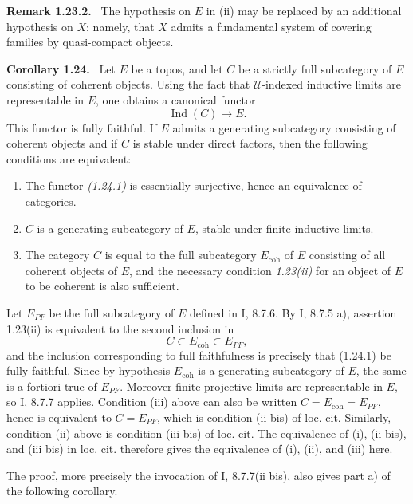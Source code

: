 \documentclass[11pt]{article}
\newcommand{\U}{\mathcal{U}}
\newcommand{\Ind}{\operatorname{Ind}}
\newcommand{\coh}{\mathrm{coh}}
\newenvironment{statement}[1]{\par\medskip\noindent\textbf{#1.}\ }{\par\medskip}
\newenvironment{remarktext}[1]{\par\medskip\noindent\textbf{#1.}\ }{\par\medskip}
\begin{document}
\begin{remarktext}{Remark 1.23.2}
The hypothesis on \(E\) in (ii) may be replaced by an additional hypothesis on \(X\): namely, that \(X\) admits a fundamental system of covering families by quasi-compact objects.
\end{remarktext}

\begin{statement}{Corollary 1.24}
Let \(E\) be a topos, and let \(C\) be a strictly full subcategory of \(E\) consisting of coherent objects. Using the fact that \(\U\)-indexed inductive limits are representable in \(E\), one obtains a canonical functor
\[
\Ind(C)\longrightarrow E.
\tag{1.24.1}
\]
This functor is fully faithful. If \(E\) admits a generating subcategory consisting of coherent objects and if \(C\) is stable under direct factors, then the following conditions are equivalent:
\begin{enumerate}[label=(\roman*)]
\item The functor \emph{(1.24.1)} is essentially surjective, hence an equivalence of categories.
\item \(C\) is a generating subcategory of \(E\), stable under finite inductive limits.
\item The category \(C\) is equal to the full subcategory \(E_{\coh}\) of \(E\) consisting of all coherent objects of \(E\), and the necessary condition \emph{1.23(ii)} for an object of \(E\) to be coherent is also sufficient.
\end{enumerate}
\end{statement}

Let \(E_{PF}\) be the full subcategory of \(E\) defined in I, 8.7.6. By I, 8.7.5 a), assertion 1.23(ii) is equivalent to the second inclusion in
\[
C\subset E_{\coh}\subset E_{PF},
\]
and the inclusion corresponding to full faithfulness is precisely that (1.24.1) be fully faithful. Since by hypothesis \(E_{\coh}\) is a generating subcategory of \(E\), the same is a fortiori true of \(E_{PF}\). Moreover finite projective limits are representable in \(E\), so I, 8.7.7 applies. Condition (iii) above can also be written \(C=E_{\coh}=E_{PF}\), hence is equivalent to \(C=E_{PF}\), which is condition (ii bis) of loc. cit. Similarly, condition (ii) above is condition (iii bis) of loc. cit. The equivalence of (i), (ii bis), and (iii bis) in loc. cit. therefore gives the equivalence of (i), (ii), and (iii) here.

The proof, more precisely the invocation of I, 8.7.7(ii bis), also gives part a) of the following corollary.
\end{document}
